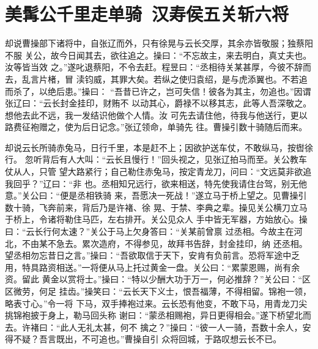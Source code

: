 \chapter{美髯公千里走单骑~汉寿侯五关斩六将}

却说曹操部下诸将中，自张辽而外，只有徐晃与云长交厚，其余亦皆敬服；独蔡阳不服
关公，故今日闻其去，欲往追之。操曰：“不忘故主，来去明白，真丈夫也。汝等皆当效
之。”遂叱退蔡阳，不令去赶。程昱曰：“丞相待关某甚厚，今彼不辞而去，乱言片楮，冒
渎钧威，其罪大矣。若纵之使归袁绍，是与虎添翼也。不若追而杀了，以绝后患。”操曰：
“吾昔已许之，岂可失信！彼各为其主，勿追也。”因谓张辽曰：“云长封金挂印，财贿不
以动其心，爵禄不以移其志，此等人吾深敬之。想他去此不远，我一发结识他做个人情。汝
可先去请住他，待我与他送行，更以路费征袍赠之，使为后日记念。”张辽领命，单骑先
往。曹操引数十骑随后而来。

却说云长所骑赤兔马，日行千里，本是赶不上；因欲护送车仗，不敢纵马，按辔徐行。
忽听背后有人大叫：“云长且慢行！”回头视之，见张辽拍马而至。关公教车仗从人，只管
望大路紧行；自己勒住赤兔马，按定青龙刀，问曰：“文远莫非欲追我回乎？”辽曰：“非
也。丞相知兄远行，欲来相送，特先使我请住台驾，别无他意。”关公曰：“便是丞相铁骑
来，吾愿决一死战！”遂立马于桥上望之。见曹操引数十骑，飞奔前来，背后乃是许褚、徐
晃、于禁、李典之辈。操见关公横刀立马于桥上，令诸将勒住马匹，左右排开。关公见众人
手中皆无军器，方始放心。操曰：“云长行何太速？”关公于马上欠身答曰：“关某前曾禀
过丞相。今故主在河北，不由某不急去。累次造府，不得参见，故拜书告辞，封金挂印，纳
还丞相。望丞相勿忘昔日之言。”操曰：“吾欲取信于天下，安肯有负前言。恐将军途中乏
用，特具路资相送。”一将便从马上托过黄金一盘。关公曰：“累蒙恩赐，尚有余资。留此
黄金以赏将士。”操曰：“特以少酬大功于万一，何必推辞？”关公曰：“区区微劳，何足
挂齿。”操笑曰：“云长天下义士，恨吾福薄，不得相留。锦袍一领，略表寸心。”令一将
下马，双手捧袍过来。云长恐有他变，不敢下马，用青龙刀尖挑锦袍披于身上，勒马回头称
谢曰：“蒙丞相赐袍，异日更得相会。”遂下桥望北而去。许褚曰：“此人无礼太甚，何不
擒之？”操曰：“彼一人一骑，吾数十余人，安得不疑？吾言既出，不可追也。”曹操自引
众将回城，于路叹想云长不已。

